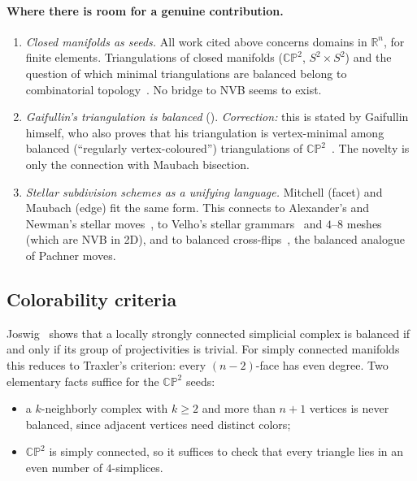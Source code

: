 \documentclass[11pt]{article}
\newcommand{\CP}{\mathbb{CP}}
\begin{document}
\paragraph{Where there is room for a genuine contribution.}
\begin{enumerate}[itemsep=2pt]
\item \emph{Closed manifolds as seeds.} All work cited above concerns domains
  in $\mathbb R^n$, for finite elements. Triangulations of closed manifolds
  ($\CP^2$, $S^2\times S^2$) and the question of which minimal
  triangulations are balanced belong to combinatorial
  topology~\cite{joswig2002,ikn2017,venturello2019}. No bridge to NVB seems
  to exist.
\item \emph{Gaifullin's triangulation is balanced} ().
  \emph{Correction:} this is stated by Gaifullin himself, who also proves
  that his triangulation is vertex-minimal among balanced
  (``regularly vertex-coloured'') triangulations of
  $\CP^2$~\cite[\S2 and Prop.~2.3]{gaifullin2009}. The novelty is only the
  connection with Maubach bisection.
\item \emph{Stellar subdivision schemes as a unifying language.} Mitchell
  (facet) and Maubach (edge) fit the same form. This connects to Alexander's
  and Newman's stellar moves~\cite{lickorish1999}, to Velho's stellar
  grammars~\cite{velho2003} and $4$--$8$ meshes~\cite{velhozorin2001}
  (which are NVB in 2D), and to balanced cross-flips~\cite{ikn2017}, the
  balanced analogue of Pachner moves.
\end{enumerate}

\subsection{Colorability criteria}
\label{sec:colorability}

Joswig~\cite{joswig2002} shows that a locally strongly connected simplicial
complex is balanced if and only if its group of projectivities is trivial.
For simply connected manifolds this reduces to Traxler's criterion: every
$(n{-}2)$-face has even degree. Two elementary facts suffice for the $\CP^2$
seeds:
\begin{itemize}[itemsep=1pt]
\item a $k$-neighborly complex with $k\ge 2$ and more than $n+1$ vertices is
  never balanced, since adjacent vertices need distinct colors;
\item $\CP^2$ is simply connected, so it suffices to check that every
  triangle lies in an even number of $4$-simplices.
\end{itemize}
\end{document}
